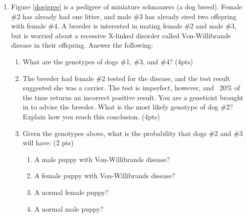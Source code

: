 \documentclass[]{article}
\begin{document}
\begin{enumerate}

\newpage
\item Figure \ref{dogigree} is a pedigree of miniature schnauzers (a dog breed). Female \#2 has already had one litter, and male \#3 has already sired two offspring with female \#4. A breeder is interested in mating female \#2 and male \#3, but is worried about a recessive X-linked disorder called Von-Willibrands disease in their offspring. Answer the following:

\begin{enumerate}
\item What are the genotypes of dogs \#1, \#3, and \#4? (4pts)
\item The breeder had female \#2 tested for the disease, and the test result suggested she was a carrier. The test is imperfect, however, and ~20\% of the time returns an incorrect positive result. You are a geneticist brought in to advise the breeder. What is the most likely genotype of dog \#2? Explain how you reach this conclusion. (4pts)
\item Given the genotypes above, what is the probability that dogs \#2 and \#3 will have: (2 pts)
\begin{enumerate}
\item A male puppy with Von-Willibrands disease?
\item A female puppy with Von-Willibrands disease?
\item A normal female puppy?
\item A normal male puppy?
\end{enumerate}
\end{enumerate}


\end{enumerate}
\end{document}
